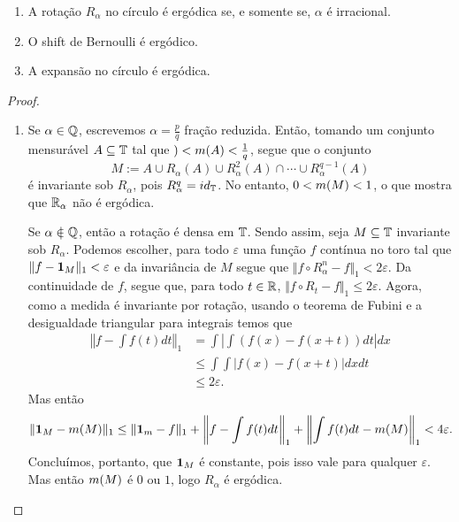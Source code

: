\begin{proposition}
	\begin{enumerate}
	\item A rotação $R_\alpha$ no círculo é ergódica se, e somente se, $\alpha$ é irracional.
	\item O shift de Bernoulli é ergódico.
	\item A expansão no círculo é ergódica.
	\end{enumerate}
\end{proposition}
\begin{proof}
\begin{enumerate}
	\item Se $\alpha \in \mathbb{Q}$, escrevemos $\alpha=\frac{p}{q}$ fração reduzida. Então, tomando um conjunto mensurável $A \subseteq \mathbb{T}$ tal que $)<m(A)<\frac{1}{q}$, segue que o conjunto
	\begin{equation*}
	M := A \cup R_{\alpha}(A) \cup R^2_{\alpha}(A) \cap \cdots \cup R^{q-1}_{\alpha}(A)
	\end{equation*}
é invariante sob $R_{\alpha}$, pois $R_{\alpha}^q=id_{\mathbb{T}}$. No entanto, $0<m(M)< 1$, o que mostra que $\mathbb{R}_\alpha$ não é ergódica.

	Se $\alpha \notin \Q$, então a rotação é densa em $\mathbb{T}$. Sendo assim, seja $M \subseteq \mathbb{T}$ invariante sob $R_\alpha$. Podemos escolher, para todo $\varepsilon$ uma função $f$  contínua no toro tal que $\Vert f-{\bm 1}_M \Vert_1 < \varepsilon$ e da invariância de $M$ segue que $\Vert f\circ R^n_\alpha-f\Vert_1<2\varepsilon$. Da continuidade de $f$, segue que, para todo $t \in \mathbb{R}$, $\Vert f\circ R_t-f\Vert_1\leq2\varepsilon$. Agora, como a medida é invariante por rotação, usando o teorema de Fubini e a desigualdade triangular para integrais temos que
	\begin{align*}
	\left\Vert f-\int f(t) dt\right\Vert_1 &= \int\left|\int (f(x)-f(x+t))dt \right|dx \\
	&\leq \int \int |f(x)-f(x+t)|dx dt \\
	&\leq 2\varepsilon.
	\end{align*}
Mas então
	\begin{equation*}
	\Vert {\bm 1}_M-m(M) \Vert_1 \leq \Vert{\bm 1}_m-f\Vert_1+\left\Vert f-\int f(t) dt\right\Vert_1+\left\Vert \int f(t) dt-m(M)\right\Vert_1<4\varepsilon.
	\end{equation*}
Concluímos, portanto, que ${\bm 1}_M$ é constante, pois isso vale para qualquer $\varepsilon$. Mas então $m(M)$ é $0$ ou $1$, logo $R_\alpha$ é ergódica.


\end{enumerate}
\end{proof}
